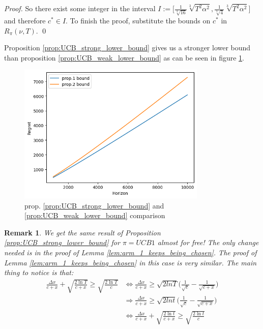 \documentclass[opre,nonblindrev]{informs3} %
\newtheorem{remark}{Remark}
\begin{document}
\begin{proof}
    So there exist some integer in the interval $I:=\bigg[\frac{1}{\sqrt[3]{16}}\sqrt[3]{T^2\alpha^2}, 
    \frac{1}{\sqrt[3]{4}}\sqrt[3]{T^2\alpha^2}\bigg]$ and therefore $c^* \in I$. To finish the proof, substitute the bounds on $c^*$ in $R_\pi(\nu, T)$. \qed
\end{proof}

Proposition \ref{prop:UCB_strong_lower_bound} gives us a stronger lower bound than proposition \ref{prop:UCB_weak_lower_bound} as can be seen in figure \ref{fig:proposition1-2_comparison}.
\begin{figure}
    \centering
    \includegraphics[width=0.8\textwidth]{graphs/proposition1-2_comparison.png}
    \caption{prop. \ref{prop:UCB_strong_lower_bound} and \ref{prop:UCB_weak_lower_bound} comparison}
    \label{fig:proposition1-2_comparison}
\end{figure}

\begin{remark}
        We get the same result of Proposition \ref{prop:UCB_strong_lower_bound} for $\pi=UCB1$ almost for free! The only change needed is in the proof of Lemma \ref{lem:arm_1_keeps_being_chosen}. The proof of Lemma \ref{lem:arm_1_keeps_being_chosen} in this case is very similar. The main thing to notice is that:
        \begin{align}
            \frac{\Delta x}{c+x}+\sqrt{\frac{2\ln{T}}{c+x}}\geq \sqrt{\frac{2\ln{T}}{c}} &\iff \frac{\Delta x}{c+x} \geq \sqrt{2lnT}\bigg(\frac{1}{\sqrt{c}}-\frac{1}{\sqrt{c+x}}\bigg)\\
            &\Longrightarrow 
            \frac{\Delta x}{c+x} \geq \sqrt{2lnt}\bigg(\frac{1}{\sqrt{c}}-\frac{1}{\sqrt{c+x}}\bigg)\\
            &\iff \frac{\Delta x}{c+x}+\sqrt{\frac{2\ln{t}}{c+x}}\geq \sqrt{\frac{2\ln{t}}{c}}
            \label{eq:iff_condition_for_keep_being_chosen_ucb1}
        \end{align}
\end{remark}
\end{document}
